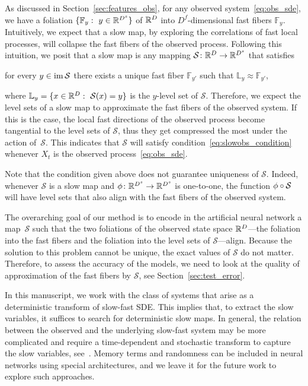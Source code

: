 \documentclass{article}
\newcommand{\smap}{\mathcal{S}} %
\newcommand{\levs}{\mathbb{L}} %
\newcommand{\ffib}{\mathbb{F}} %
\newcommand{\sman}{\mathbb{S}} %
\begin{document}
As discussed in Section~\ref{sec:features_obs}, for any observed system~\eqref{eq:obs_sde}, we have a foliation $\{\ffib_y:\ y\in\R^{D^s}\}$ of $\mathbb{R}^D$ into $D^f$-dimensional fast fibers $\ffib_y$.
Intuitively, we expect that a slow map, by exploring the correlations of fast local processes, will collapse the fast fibers of the observed process. Following this intuition, we posit that a slow map is any mapping $\smap\from\R^D\to\R^{D^s}$ that satisfies
\begin{center}
    for every $y\in\img\smap$ there exists a unique fast fiber $\ffib_{y'}$ such that $\levs_y \approx \ffib_{y'}$,
\end{center}
where $\levs_y = \{x\in\R^{D}:\ \smap(x)=y\}$ is the $y$-level set of $\smap$. Therefore, we expect the level sets of a slow map to approximate the fast fibers of the observed system. If this is the case, the local fast directions of the observed process become tangential to the level sets of $\smap$, thus they get compressed the most under the action of~$\smap$. This indicates that $\smap$ will satisfy condition~\eqref{eq:slowobs_condition} whenever $X_t$ is the observed process~\eqref{eq:obs_sde}.

\begin{rem}\label{rem:non-uniq}
Note that the condition given above does not guarantee uniqueness of $\smap$. Indeed, whenever $\smap$ is a slow map and $\phi\colon\mathbb{R}^{D^s}\to\mathbb{R}^{D^s}$ is one-to-one, the function $\ph\circ\smap$ will have level sets that also align with the fast fibers of the observed system.
\end{rem}

The overarching goal of our method is to encode in the artificial neural network a map~$\smap$ such that the two foliations of the observed state space $\mathbb{R}^D$---the foliation into the fast fibers and the foliation into the level sets of $\smap$---align. Because the solution to this problem cannot be unique, the exact values of $\smap$ do not matter. Therefore, to assess the accuracy of the models, we need to look at the quality of approximation of the fast fibers by $\smap$, see Section~\ref{sec:test_error}.

\begin{rem}
In this manuscript, we work with the class of systems that arise as a deterministic transform of slow-fast SDE. This implies that, to extract the slow variables, it suffices to search for deterministic slow maps. In general, the relation between the observed and the underlying slow-fast system may be more complicated and require a time-dependent and stochastic transform to capture the slow variables, see~\cite{roberts_normal_2008}. Memory terms and randomness can be included in neural networks using special architectures, and we leave it for the future work to explore such approaches.
\end{rem}
\end{document}
